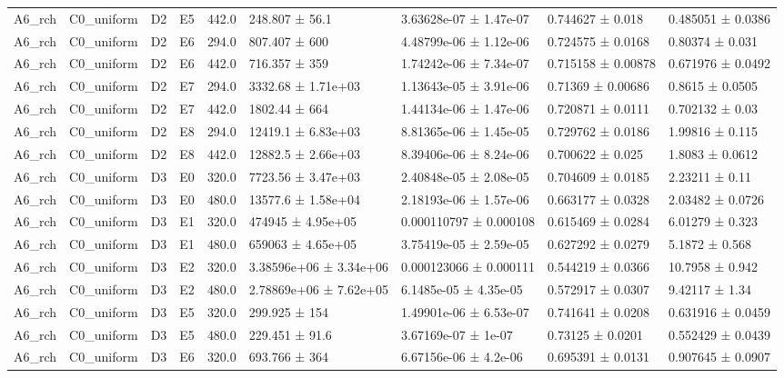 \begin{table}
\begin{tabular}{lllllllll}
A6\_rch & C0\_uniform & D2 & E5 & 442.0 & 248.807 ± 56.1 & 3.63628e-07 ± 1.47e-07 & 0.744627 ± 0.018 & 0.485051 ± 0.0386 \\
A6\_rch & C0\_uniform & D2 & E6 & 294.0 & 807.407 ± 600 & 4.48799e-06 ± 1.12e-06 & 0.724575 ± 0.0168 & 0.80374 ± 0.031 \\
A6\_rch & C0\_uniform & D2 & E6 & 442.0 & 716.357 ± 359 & 1.74242e-06 ± 7.34e-07 & 0.715158 ± 0.00878 & 0.671976 ± 0.0492 \\
A6\_rch & C0\_uniform & D2 & E7 & 294.0 & 3332.68 ± 1.71e+03 & 1.13643e-05 ± 3.91e-06 & 0.71369 ± 0.00686 & 0.8615 ± 0.0505 \\
A6\_rch & C0\_uniform & D2 & E7 & 442.0 & 1802.44 ± 664 & 1.44134e-06 ± 1.47e-06 & 0.720871 ± 0.0111 & 0.702132 ± 0.03 \\
A6\_rch & C0\_uniform & D2 & E8 & 294.0 & 12419.1 ± 6.83e+03 & 8.81365e-06 ± 1.45e-05 & 0.729762 ± 0.0186 & 1.99816 ± 0.115 \\
A6\_rch & C0\_uniform & D2 & E8 & 442.0 & 12882.5 ± 2.66e+03 & 8.39406e-06 ± 8.24e-06 & 0.700622 ± 0.025 & 1.8083 ± 0.0612 \\
A6\_rch & C0\_uniform & D3 & E0 & 320.0 & 7723.56 ± 3.47e+03 & 2.40848e-05 ± 2.08e-05 & 0.704609 ± 0.0185 & 2.23211 ± 0.11 \\
A6\_rch & C0\_uniform & D3 & E0 & 480.0 & 13577.6 ± 1.58e+04 & 2.18193e-06 ± 1.57e-06 & 0.663177 ± 0.0328 & 2.03482 ± 0.0726 \\
A6\_rch & C0\_uniform & D3 & E1 & 320.0 & 474945 ± 4.95e+05 & 0.000110797 ± 0.000108 & 0.615469 ± 0.0284 & 6.01279 ± 0.323 \\
A6\_rch & C0\_uniform & D3 & E1 & 480.0 & 659063 ± 4.65e+05 & 3.75419e-05 ± 2.59e-05 & 0.627292 ± 0.0279 & 5.1872 ± 0.568 \\
A6\_rch & C0\_uniform & D3 & E2 & 320.0 & 3.38596e+06 ± 3.34e+06 & 0.000123066 ± 0.000111 & 0.544219 ± 0.0366 & 10.7958 ± 0.942 \\
A6\_rch & C0\_uniform & D3 & E2 & 480.0 & 2.78869e+06 ± 7.62e+05 & 6.1485e-05 ± 4.35e-05 & 0.572917 ± 0.0307 & 9.42117 ± 1.34 \\
A6\_rch & C0\_uniform & D3 & E5 & 320.0 & 299.925 ± 154 & 1.49901e-06 ± 6.53e-07 & 0.741641 ± 0.0208 & 0.631916 ± 0.0459 \\
A6\_rch & C0\_uniform & D3 & E5 & 480.0 & 229.451 ± 91.6 & 3.67169e-07 ± 1e-07 & 0.73125 ± 0.0201 & 0.552429 ± 0.0439 \\
A6\_rch & C0\_uniform & D3 & E6 & 320.0 & 693.766 ± 364 & 6.67156e-06 ± 4.2e-06 & 0.695391 ± 0.0131 & 0.907645 ± 0.0907 \\

\end{tabular}
\end{table}
